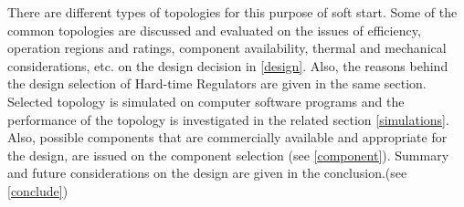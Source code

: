 There are different types of topologies for this purpose of soft start. Some of the common topologies are discussed and evaluated on the issues of efficiency, operation regions and ratings, component availability, thermal and mechanical considerations, etc. on the design decision in \ref{design}. Also, the reasons behind the  design selection of Hard-time Regulators are given in the same section. Selected topology is simulated on computer software programs and the performance of the topology is investigated in the related section \ref{simulations}. Also, possible components that are commercially available and appropriate for the design, are issued on the component selection (see \ref{component}). Summary and future considerations on the design are given in the conclusion.(see \ref{conclude})